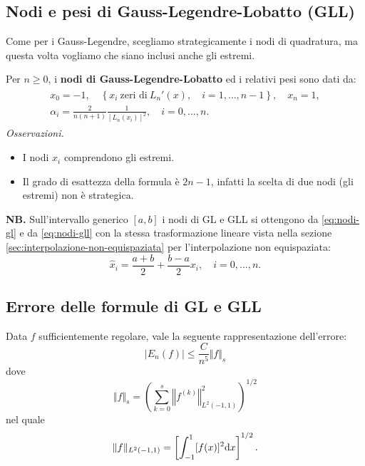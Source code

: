 \subsection{Nodi e pesi di Gauss-Legendre-Lobatto (GLL)}
Come per i Gauss-Legendre, scegliamo strategicamente i nodi di quadratura, ma questa volta vogliamo che siano inclusi anche gli estremi.

Per $n\geqslant 0$, i \textbf{nodi di Gauss-Legendre-Lobatto} ed i relativi pesi sono dati da:
\begin{gather}
\begin{split}
x_{0} =-1,\quad \left\{x_{i} \ \text{zeri di} \ L_{n} '(x) ,\quad i=1,\dotsc ,n-1\right\} ,\quad x_{n} =1,\\
\alpha _{i} =\frac{2}{n( n+1)}\frac{1}{[ L_{n}( x_{i})]^{2}} ,\quad i=0,\dotsc ,n.
\end{split}
\label{eq:nodi-gll}
\end{gather}
\textit{Osservazioni.}
\begin{itemize}
\item I nodi $x_{i}$ comprendono gli estremi.
\item Il grado di esattezza della formula è $2n-1$, infatti la scelta di due nodi (gli estremi) non è strategica.
\end{itemize}

\textbf{NB.}
Sull'intervallo generico $[ a,b]$ i nodi di GL e GLL si ottengono da \eqref{eq:nodi-gl} e da \eqref{eq:nodi-gll} con la stessa trasformazione lineare vista nella sezione \ref{sec:interpolazione-non-equispaziata} per l'interpolazione non equispaziata:
\begin{equation*}
\hat{x}_{i} =\frac{a+b}{2} +\frac{b-a}{2} x_{i}, \quad i=0,\dotsc ,n.
\end{equation*}

\subsection{Errore delle formule di GL e GLL}
Data $f$ sufficientemente regolare, vale la seguente rappresentazione dell'errore:
\begin{equation*}
| E_{n}(f)| \leqslant \frac{C}{n^{5}}\Vert f\Vert _{s}
\end{equation*}
dove
\begin{equation*}
\Vert f\Vert _{s} =\left(\sum\limits ^{s}_{k=0}\left\Vert f^{(k)}\right\Vert ^{2}_{L^{2}( -1,1)}\right)^{1/2}
\end{equation*}
nel quale
\begin{equation*}
\Vert f\Vert _{L^{2}( -1,1)} =\left[\int\nolimits ^{1}_{-1}[ f(x)]^{2} \mathrm d x\right]^{1/2} .
\end{equation*}

